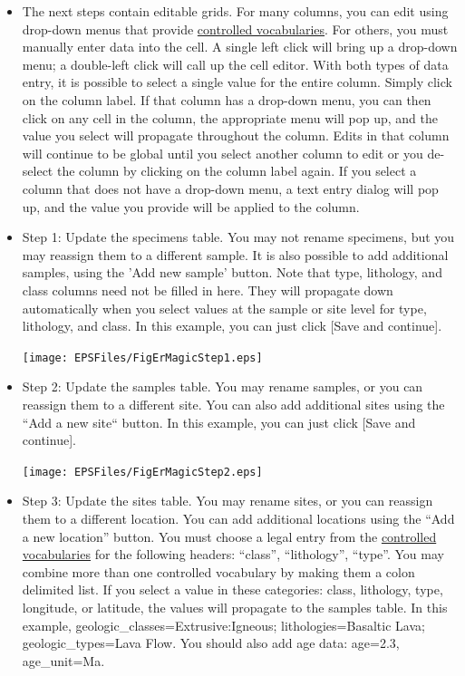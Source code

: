 \documentclass[11pt]{book}
\begin{document}
{{\begin{itemize}
 \texttt{[image: EPSFiles/FigErMagicStep0.eps]}

 \item The next steps contain editable grids.  For many columns, you can edit using drop-down menus that provide \href{http://earthref.org/MAGIC/shortlists.htm}{controlled vocabularies}.  For others, you must manually enter data into the cell.  A single left click will bring up a drop-down menu; a double-left click will call up the cell editor.  With both types of data entry, it is possible to select a single value for the entire column. Simply click on the column label.  If that column has a drop-down menu, you can then click on any cell in the column, the appropriate menu will pop up, and the value you select will propagate throughout the column.  Edits in that column will continue to be global until you select another column to edit or you de-select the column by clicking on the column label again.  If you select a column that does not have a drop-down menu, a text entry dialog will pop up, and the value you provide will be applied to the column.

 \item Step 1: Update the specimens table.  You may not rename specimens, but you may reassign them to a different sample.  It is also possible to add additional samples, using the 'Add new sample' button.  Note that type, lithology, and class columns need not be filled in here.  They will propagate down automatically when you select values at the sample or site level for type, lithology, and class.  In this example, you can just click [Save and continue].

 \texttt{[image: EPSFiles/FigErMagicStep1.eps]}

\item Step 2:  Update the samples table.  You may rename samples, or you can reassign them to a different site.  You can also add additional sites using the ``Add a new site`` button.  In this example, you can just click [Save and continue].

 \texttt{[image: EPSFiles/FigErMagicStep2.eps]}

\item Step 3: Update the sites table.  You may rename sites, or you can reassign them to a different location.  You can add additional locations using the ``Add a new location'' button.  You must choose a legal entry from the \href{http://earthref.org/MAGIC/shortlists.htm}{controlled vocabularies} for the following headers: ``class'', ``lithology'', ``type''. You may combine more than one controlled vocabulary by making them a colon delimited list.  If you select a value in these categories: class, lithology, type, longitude, or latitude, the values will propagate to the samples table.  In this example,  geologic_classes=Extrusive:Igneous; lithologies=Basaltic Lava; geologic_types=Lava Flow.  You should also add age data: age=2.3, age_unit=Ma.


\end{itemize}}}
\end{document}
